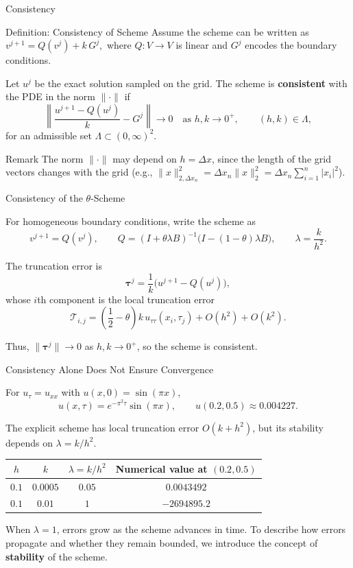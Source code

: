 \documentclass{beamer}
\begin{document}
\begin{frame}{Consistency}

\begin{block}{Definition: Consistency of Scheme}
Assume the scheme can be written as $v^{j+1}=Q(v^j)+k\,G^j,$
where $Q:V\to V$ is linear and $G^j$ encodes the boundary conditions.

Let $u^j$ be the exact solution sampled on the grid. The scheme is
\textbf{consistent} with the PDE in the norm $\|\cdot\|$ if
\[
\left\|
\frac{u^{j+1}-Q(u^j)}{k}-G^j
\right\|\longrightarrow 0
\quad\text{as }h,k\longrightarrow0^+,
\qquad (h,k)\in\Lambda,
\]
for an admissible set $\Lambda\subset(0,\infty)^2$.
\end{block}
\begin{block}{Remark}
The norm $\|\cdot\|$ may depend on $h=\Delta x$,
since the length of the grid vectors changes with the grid (e.g., $\|x\|_{2,\Delta x_n}^2
=
\Delta x_n\|x\|_2^2
=
\Delta x_n\sum_{i=1}^n |x_i|^2$).
\end{block}
\end{frame}

\begin{frame}{Consistency of the $\theta$-Scheme}

For homogeneous boundary conditions, write the scheme as
\[
v^{j+1}=Q(v^j),\qquad
Q=(I+\theta\lambda B)^{-1}
\bigl(I-(1-\theta)\lambda B\bigr),
\qquad \lambda=\frac{k}{h^2}.
\]

The truncation error is
\[
\boldsymbol{\tau}^j=\frac{1}{k}\bigl(u^{j+1}-Q(u^j)\bigr),
\]
whose $i$th component is the local truncation error
\[
\mathcal{T}_{i,j}
=
\left(\frac12-\theta\right)k\,u_{\tau\tau}(x_i,\tau_j)
+O(h^2)+O(k^2).
\]

Thus, $\|\boldsymbol{\tau}^j\|\to0$ as $h,k\to0^+$, so the scheme is consistent.

\end{frame}

\begin{frame}{Consistency Alone Does Not Ensure Convergence}

For $u_\tau=u_{xx}$ with $u(x,0)=\sin(\pi x)$,
\[
u(x,\tau)=e^{-\pi^2\tau}\sin(\pi x),
\qquad
u(0.2,0.5)\approx0.004227.
\]

The explicit scheme has local truncation error
$O(k+h^2)$, but its stability depends on $\lambda=k/h^2$.

\begin{center}
\begin{tabular}{cccc}
\toprule
$h$ & $k$ & $\lambda=k/h^2$ & Numerical value at $(0.2,0.5)$\\
\midrule
$0.1$ & $0.0005$ & $0.05$ & $0.0043492$\\
$0.1$ & $0.01$ & $1$ & $-2694895.2$\\
\bottomrule
\end{tabular}
\end{center}

When $\lambda=1$, errors grow as the scheme advances in time.
To describe how errors propagate and whether they remain bounded,
we introduce the concept of \textbf{stability} of the scheme.
\end{frame}
\end{document}
